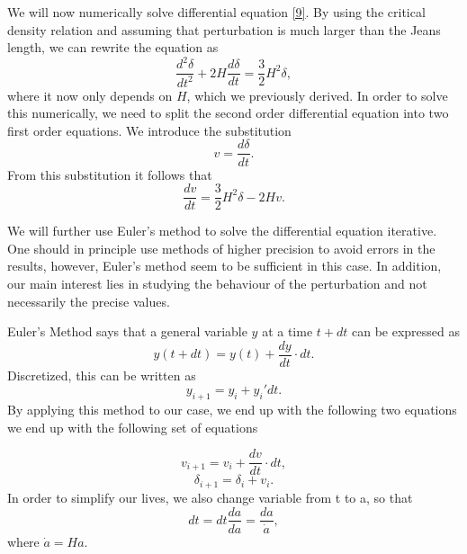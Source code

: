 \documentclass[a4paper]{article}
\begin{document}
We will now numerically solve differential equation \eqref{9}. By using the critical density relation and assuming that perturbation is much larger than the Jeans length, we can rewrite the equation as
\begin{equation}
    \frac{d^2 \delta}{dt^2} + 2H\frac{d \delta}{dt} = \frac{3}{2}H^2 \delta,
\end{equation}
where it now only depends on $H$, which we previously derived.
In order to solve this numerically, we need to split the second order differential equation into two first order equations. We introduce the substitution 
\begin{equation}
    v = \frac{d\delta}{d t}.
\end{equation}
From this substitution it follows that
\begin{equation}
    \frac{dv}{dt} = \frac{3}{2}H^2 \delta - 2Hv.
\end{equation}

We will further use Euler's method to solve the differential equation iterative. One should in principle use methods of higher precision to avoid errors in the results, however, Euler's method seem to be sufficient in this case. In addition, our main interest lies in studying the behaviour of the perturbation and not necessarily the precise values. 

Euler's Method says that a general variable $y$ at a time $t + dt$ can be expressed as
\[
y(t + dt) = y(t) + \frac{dy}{dt} \cdot dt.
\]
Discretized, this can be written as 
\begin{equation}
    y_{i+1} = y_i + y_i'dt.
\end{equation}
By applying this method to our case, we end up with the following two equations we end up with the following set of equations

\begin{equation}
    v_{i+1} = v_i + \frac{dv}{dt}\cdot dt,
\end{equation}
\begin{equation}
    \delta_{i+1} = \delta_i + v_i.
\end{equation}
In order to simplify our lives, we also change variable from t to a, so that \[
dt = dt\frac{da}{da} = \frac{da}{\dot{a}},
\]
where $\dot{a} = H a$. 
\end{document}
